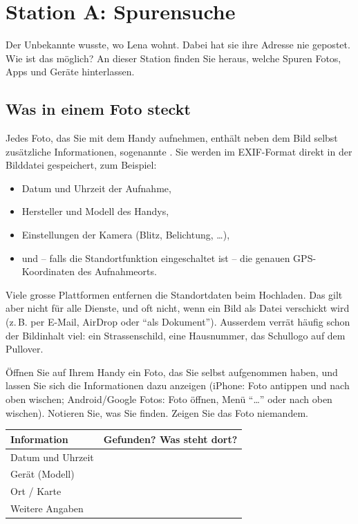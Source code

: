 \chapter{Station A: Spurensuche}\label{ch:spurensuche}

\begin{myremark}
	Der Unbekannte wusste, wo Lena wohnt. Dabei hat sie ihre Adresse nie gepostet.
	Wie ist das möglich? An dieser Station finden Sie heraus, welche Spuren Fotos, Apps und Geräte hinterlassen.
\end{myremark}

\section{Was in einem Foto steckt}

Jedes Foto, das Sie mit dem Handy aufnehmen, enthält neben dem Bild selbst zusätzliche Informationen, sogenannte .
Sie werden im \acrshort{EXIF}-Format direkt in der Bilddatei gespeichert, zum Beispiel:
\begin{itemize}
	\item Datum und Uhrzeit der Aufnahme,
	\item Hersteller und Modell des Handys,
	\item Einstellungen der Kamera (Blitz, Belichtung, \dots),
	\item und -- falls die Standortfunktion eingeschaltet ist -- die genauen \acrshort{GPS}-Koordinaten des Aufnahmeorts.
\end{itemize}

Viele grosse Plattformen entfernen die Standortdaten beim Hochladen. Das gilt aber nicht für alle Dienste, und oft nicht, wenn ein Bild als Datei verschickt wird (z.\,B. per E-Mail, AirDrop oder \enquote{als Dokument}).
Ausserdem verrät häufig schon der Bildinhalt viel: ein Strassenschild, eine Hausnummer, das Schullogo auf dem Pullover.

\begin{myexercise}
	Öffnen Sie auf Ihrem Handy ein Foto, das Sie selbst aufgenommen haben, und lassen Sie sich die Informationen dazu anzeigen
	(iPhone: Foto antippen und nach oben wischen; Android/Google Fotos: Foto öffnen, Menü \enquote{\dots} oder nach oben wischen).
	Notieren Sie, was Sie finden. Zeigen Sie das Foto niemandem.

	\begin{center}
		\renewcommand{\arraystretch}{1.6}
		\begin{tabular}{p{5cm}p{8cm}}
			\textbf{Information}       & \textbf{Gefunden? Was steht dort?} \\
			\midrule
			Datum und Uhrzeit          &                                    \\
			Gerät (Modell)             &                                    \\
			Ort / Karte                &                                    \\
			Weitere Angaben            &                                    \\
		\end{tabular}
	\end{center}
\end{myexercise}

